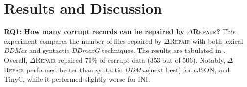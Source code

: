 \documentclass[sigconf,review,anonymous]{acmart}
\newcommand{\formatfree}{format-free\xspace}
\newcommand{\formatdependent}{format-dependent\xspace}
\newcommand{\dtask}{data repair\xspace}
\newcommand{\approach}{\textsc{$\Delta$Repair}\xspace}
\newcommand{\ddmax}{\textit{DDMax}\xspace}
\newcommand{\ddmaxg}{\textit{DDmaxG}\xspace}
\newcommand{\drepair}{\approach}
\begin{document}
\section{Results and Discussion}
\label{sec:discussion}
\noindent\textbf{RQ1: How many corrupt records can be repaired by \drepair?}
This experiment compares the number of files repaired by \drepair with both
lexical \ddmax and syntactic \ddmaxg techniques.
The results are tabulated in .
Overall, \drepair repaired 70\% of corrupt data (353 out of 506). %
Notably, \drepair performed better than syntactic \ddmax (next best)
for cJSON, and TinyC, while it performed slightly worse for INI.

%
\end{document}
